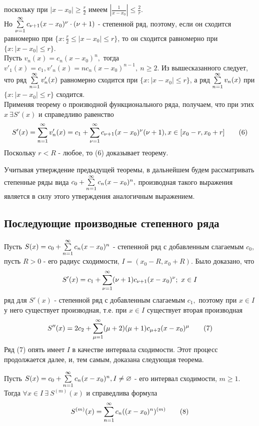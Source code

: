 \documentclass[main]{subfiles}
\begin{document}
\begin{longProof}
   поскольку при $|x-x_0|\geq\frac{r}{2}$ имеем $|\frac{1}{x-x_0}|\leq\frac{2}{r}.$\\ 
 Но $\su[\nu=1] c_{\nu+1}(x-x_0)^\nu\cdot(\nu+1)$ - степенной ряд, поэтому, если он сходится равномерно при $\{ x: \frac{r}{2}\leq|x-x_0|\leq r\}$,
 то он сходится равномерно при $\{ x: |x-x_0|\leq r\}$.\\
Пусть $v_n(x)=c_n(x-x_0)^n,$ тогда $v'_1(x)=c_1, v'_n(x)=nc_n(x-x_0)^{n-1},\ n\geq 2.$ Из вышесказанного следует, что ряд $\su v_n'(x)$ равномерно сходится при $\{ x: |x-x_0|\leq r\}$, а ряд $\su v_n(x)$ при $\{ x: |x-x_0|\leq r\}$ сходится.\\
Применяя теорему о производной функционального ряда, получаем, что при этих $x\ \exists S'(x)$ и справедливо равенство 
\[ S'(x)=\su v_n'(x)=c_1+\su[\nu=1]c_{\nu+1}(x-x_0)^{\nu}(\nu+1), x\in [x_0-r, x_0+r]\tag{6} \]
Поскольку $r<R$ - любое, то (6) доказывает теорему.
\end{longProof}
Учитывая утверждение предыдущей теоремы, в дальнейшем будем рассматривать степенные ряды вида $c_0+\su c_n(x-x_0)^n,$ производная 
такого выражения является в силу этого утверждения аналогичным выражением.
\subsection{Последующие производные степенного ряда}
Пусть $S(x)=c_0+\su c_n(x-x_0)^n$ - степенной ряд с добавленным слагаемым $c_0,$ пусть $R>0$ - его радиус сходимости,
 $I=(x_0-R,x_0+R)$. Было доказано, что \[ S'(x)=c_1+\su[\nu=1](\nu+1)c_{\nu+1}(x-x_0)^\nu;\ x\in I \]
ряд для $S'(x)$ - степенной ряд с добавленным слагаемым $c_1,$ поэтому при $x\in I$ у него существует производная,
 т.е. при $x\in I$ существует вторая производная \[ S''(x)=2c_2+\su[\mu=1](\mu+2)(\mu+1)c_{\mu+2}(x-x_0)^\mu\tag{7} \]
Ряд (7) опять имеет $I$ в качестве интервала сходимости. Этот процесс продолжается далее, и, тем самым, доказана следующая теорема.\\
\begin{theorem} Пусть $S(x)=c_0+\su c_n(x-x_0)^n, I\ne\varnothing$ - его интервал сходимости, $m\geq 1.$\\
Тогда $\forall x\in I\ \exists\ S^{(m)}(x)$ и справедлива формула
\[ S^{(m)}(x)=\su c_n((x-x_0)^n)^{(m)}\tag{8} \]
\end{theorem}
\end{document}

